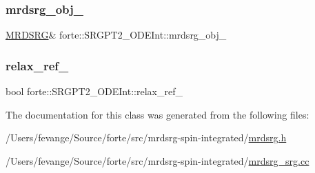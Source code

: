 \subsubsection{\texorpdfstring{mrdsrg\+\_\+obj\+\_\+}{mrdsrg\_obj\_}}
{\footnotesize\ttfamily \mbox{\hyperlink{classforte_1_1_m_r_d_s_r_g}{M\+R\+D\+S\+RG}}\& forte\+::\+S\+R\+G\+P\+T2\+\_\+\+O\+D\+E\+Int\+::mrdsrg\+\_\+obj\+\_\+\hspace{0.3cm}{\ttfamily [protected]}}

\mbox{\label{classforte_1_1_s_r_g_p_t2___o_d_e_int_a53b24bd932c31ebbaf6aa956d14b70c7}} 
\subsubsection{\texorpdfstring{relax\+\_\+ref\+\_\+}{relax\_ref\_}}
{\footnotesize\ttfamily bool forte\+::\+S\+R\+G\+P\+T2\+\_\+\+O\+D\+E\+Int\+::relax\+\_\+ref\+\_\+\hspace{0.3cm}{\ttfamily [protected]}}



The documentation for this class was generated from the following files\+:\begin{DoxyCompactItemize}
\item 
/\+Users/fevange/\+Source/forte/src/mrdsrg-\/spin-\/integrated/\mbox{\hyperlink{mrdsrg_8h}{mrdsrg.\+h}}\item 
/\+Users/fevange/\+Source/forte/src/mrdsrg-\/spin-\/integrated/\mbox{\hyperlink{mrdsrg__srg_8cc}{mrdsrg\+\_\+srg.\+cc}}\end{DoxyCompactItemize}

